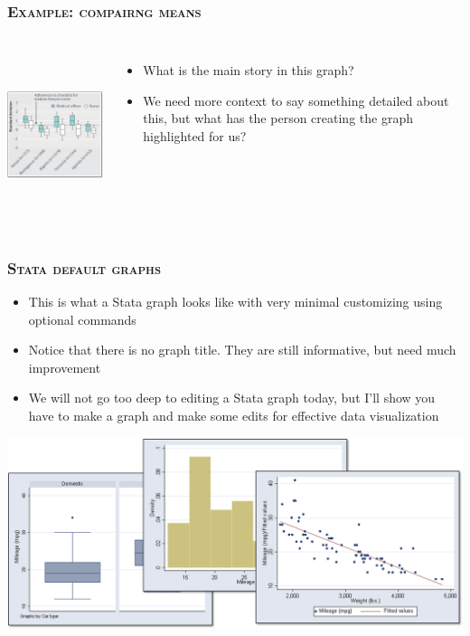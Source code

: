 \documentclass[10pt]{beamer}
\begin{document}
	\begin{frame}
	\frametitle{\textsc{Example: compairng means}}
		\begin{columns}
		\includegraphics[height=5cm, width=6cm]{figure_example_2}
		\hspace{5mm}
		\begin{itemize}
			\item What is the main story in this graph? 
			\item We need more context to say something detailed about this, 
				  but what has the person creating the graph highlighted for us?
		\end{itemize}
		\end{columns} 
	\end{frame}
	
	
	\begin{frame}
	\frametitle{\textsc{Stata default graphs}}
		\begin{itemize}
			\item This is what a Stata graph looks like with very minimal 
				  customizing using optional commands
			\item Notice that there is no graph title. 
				  They are still informative, but need much improvement
			\item We will not go too deep to editing a Stata graph today,
				  but I'll show you have to make a graph and make some edits
				  for effective data visualization
		\end{itemize}	
		\begin{center}
			\includegraphics[width=\linewidth]{figure_example_3}
		\end{center}
	\end{frame}
\end{document}
